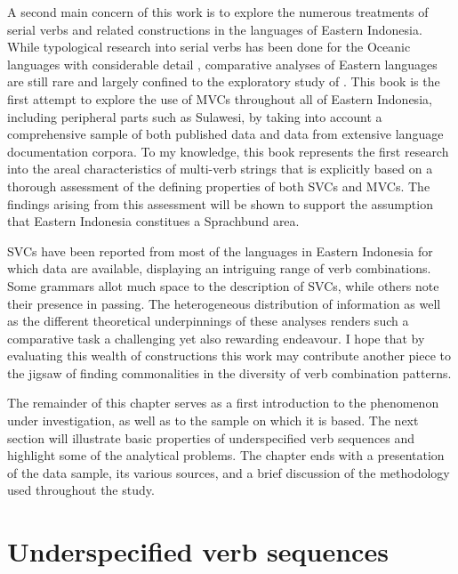 A second main concern of this work is to explore the numerous treatments of serial verbs and related constructions in the languages of Eastern Indonesia. While typological research into serial verbs has been done for the Oceanic languages with considerable detail \citep{crowley2002serial, bril2004complex, bril2007nexus}, comparative analyses of Eastern  languages are still rare and largely confined to the exploratory study of \citet{vanstaden2008serial}. This book is the first attempt to explore the use of MVCs throughout all of Eastern Indonesia, including peripheral parts such as Sulawesi, by taking into account a comprehensive sample of both published data and data from extensive language documentation corpora. To my knowledge, this book represents the first research into the areal characteristics of multi-verb strings that is explicitly based on a thorough assessment of the defining properties of both SVCs and MVCs. The findings arising from this assessment will be shown to support the assumption that Eastern Indonesia constitues a Sprachbund area.

SVCs have been reported from most of the languages in Eastern Indonesia for which data are available, displaying an intriguing range of verb combinations. Some grammars allot much space to the description of SVCs, while others note their presence in passing. The heterogeneous distribution of information as well as the different theoretical underpinnings of these analyses renders such a comparative task a challenging yet also rewarding endeavour. I hope that by evaluating this wealth of constructions this work may contribute another piece to the jigsaw of finding commonalities in the diversity of verb combination patterns.

The remainder of this chapter serves as a first introduction to the phenomenon under investigation, as well as to the sample on which it is based. The next section will illustrate basic properties of underspecified verb sequences and highlight some of the analytical problems. The chapter ends with a presentation of the data sample, its various sources, and a brief discussion of the methodology used throughout the study.

\section{Underspecified verb sequences}\label{underspecified}

